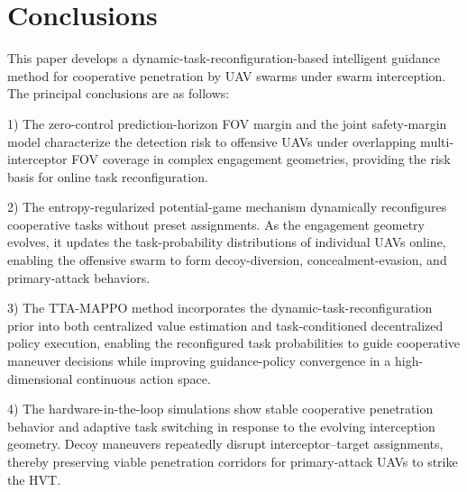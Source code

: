 \documentclass[unbranded]{cja}
\begin{document}
\section{Conclusions}
\label{sec:conclusion}

This paper develops a dynamic-task-reconfiguration-based intelligent guidance method for cooperative penetration by UAV swarms under swarm interception. The principal conclusions are as follows:


1) The zero-control prediction-horizon FOV margin and the joint safety-margin model characterize the detection risk to offensive UAVs under overlapping multi-interceptor FOV coverage in complex engagement geometries, providing the risk basis for online task reconfiguration.

2) The entropy-regularized potential-game mechanism dynamically reconfigures cooperative tasks without preset assignments. As the engagement geometry evolves, it updates the task-probability distributions of individual UAVs online, enabling the offensive swarm to form decoy-diversion, concealment-evasion, and primary-attack behaviors.

3) The TTA-MAPPO method incorporates the dynamic-task-reconfiguration prior into both centralized value estimation and task-conditioned decentralized policy execution, enabling the reconfigured task probabilities to guide cooperative maneuver decisions while improving guidance-policy convergence in a high-dimensional continuous action space.

4) The hardware-in-the-loop simulations show stable cooperative penetration behavior and adaptive task switching in response to the evolving interception geometry. Decoy maneuvers repeatedly disrupt interceptor--target assignments, thereby preserving viable penetration corridors for primary-attack UAVs to strike the HVT.
\end{document}
